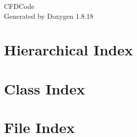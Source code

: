 \let\mypdfximage\pdfximage\def\pdfximage{\immediate\mypdfximage}\documentclass[twoside]{book}
\newcommand{\+}{\discretionary{\mbox{\scriptsize$\hookleftarrow$}}{}{}}
\newcommand{\clearemptydoublepage}{%
  \newpage{\pagestyle{empty}\cleardoublepage}%
}
\begin{document}
\hypersetup{pageanchor=false,
             bookmarksnumbered=true,
             pdfencoding=unicode
            }
\begin{titlepage}
\vspace*{7cm}
\begin{center}%
{\Large C\+F\+D\+Code }\\
\vspace*{1cm}
{\large Generated by Doxygen 1.8.18}\\
\end{center}
\end{titlepage}
\clearemptydoublepage
{}
\tableofcontents
\clearemptydoublepage
{}
\hypersetup{pageanchor=true}

\chapter{Hierarchical Index}

\chapter{Class Index}

\chapter{File Index}

\end{document}
